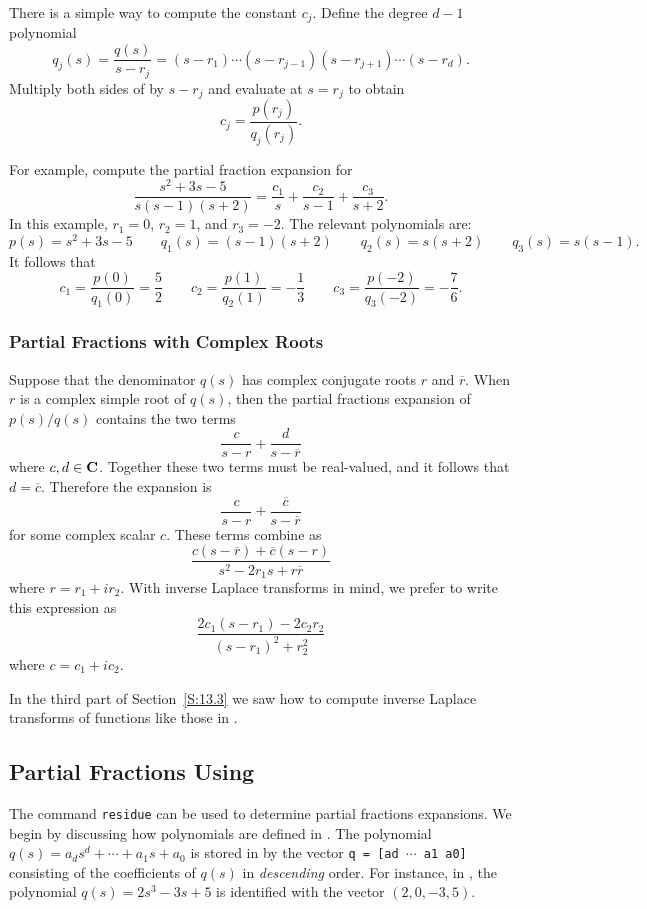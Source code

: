 There is a simple way to compute the constant $c_j$. Define the degree $d-1$
polynomial
\[
q_j(s) = \frac{q(s)}{s-r_j} = 
(s-r_1)\cdots(s-r_{j-1})(s-r_{j+1})\cdots(s-r_d).
\]
Multiply both sides of  by $s-r_j$ and evaluate at $s=r_j$ to 
obtain
\[
c_j = \frac{p(r_j)}{q_j(r_j)}.
\]   

For example, compute the partial fraction expansion for
\[
\frac{s^2+3s-5}{s(s-1)(s+2)} = \frac{c_1}{s}+\frac{c_2}{s-1}+\frac{c_3}{s+2}.
\]
In this example, $r_1=0$, $r_2=1$, and $r_3=-2$.  The relevant polynomials
are:
\[
p(s) = s^2+3s-5 \qquad q_1(s) = (s-1)(s+2) \qquad q_2(s) = s(s+2) \qquad
q_3(s) = s(s-1).
\]
It follows that 
\[
c_1 = \frac{p(0)}{q_1(0)} = \frac{5}{2} \qquad
c_2 = \frac{p(1)}{q_2(1)} = -\frac{1}{3} \qquad
c_3 = \frac{p(-2)}{q_3(-2)} = -\frac{7}{6}.
\]

\subsubsection*{Partial Fractions with Complex Roots}


Suppose that the denominator $q(s)$ has complex conjugate roots $r$ and 
$\overline{r}$.  When $r$ is a complex simple root of $q(s)$, then the 
partial fractions expansion of $p(s)/q(s)$ contains the two terms
\[
\frac{c}{s-r} + \frac{d}{s-\overline{r}}
\]
where $c,d\in\mbox{$\bf{C}$}$.  Together these two terms must be real-valued, and it 
follows that $d=\overline{c}$.  Therefore the expansion is 
\[
\frac{c}{s-r} + \frac{\overline{c}}{s-\overline{r}}
\]
for some complex scalar $c$.  These terms combine as
\[
\frac{c(s-\overline{r})+ \overline{c}(s-r)}{s^2-2r_1s+r\overline{r}}
\]
where $r=r_1+ir_2$.  With inverse Laplace transforms in mind, we prefer 
to write this expression as
\begin{equation}  \label{e:pfreal}
\frac{2c_1(s-r_1)-2c_2r_2}{(s-r_1)^2+r_2^2}
\end{equation}
where $c=c_1+ic_2$.  

In the third part of Section~\ref{S:13.3} we saw how to compute inverse 
Laplace transforms of functions like those in .



\subsection*{Partial Fractions Using \Matlab}

The \Matlab command {\tt residue} can be used to 
determine partial fractions
expansions.  We begin by discussing how polynomials are defined in \Matlabp.  
The polynomial $q(s)=a_ds^d+\cdots+a_1s+a_0$ is stored in \Matlab by the 
vector {\tt q = [ad $\cdots$ a1 a0]} consisting of the coefficients of $q(s)$ 
in {\em descending\/} order.  For instance, in \Matlabp, the polynomial 
$q(s)=2s^3 - 3s +5$ is identified with the vector $(2,0,-3,5)$.  

